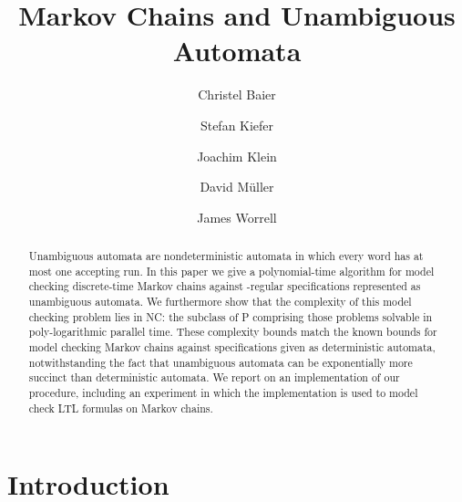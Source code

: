 \documentclass{elsarticle}
\begin{document}
\begin{abstract}
  Unambiguous automata are nondeterministic automata in which every
  word has at most one accepting run.  In this paper we give a
  polynomial-time algorithm for model checking discrete-time Markov
  chains against -regular specifications represented as unambiguous
  automata.  We furthermore show that the complexity of this model
  checking problem lies in NC: the subclass of P comprising
  those problems solvable in poly-logarithmic parallel time.  These
  complexity bounds match the known bounds for model checking Markov
  chains against specifications given as deterministic automata,
  notwithstanding the fact that unambiguous automata can be
  exponentially more succinct than deterministic automata.  We report
  on an implementation of our procedure, including an experiment in
  which the implementation is used to model check LTL formulas on
  Markov chains.
\end{abstract}
\pagestyle{headings}  

\title{Markov Chains and Unambiguous Automata}


\author[tud]{Christel Baier\texorpdfstring{}{}}
\author[oxf]{Stefan Kiefer\texorpdfstring{}{}}
\author[tud]{Joachim Klein\texorpdfstring{}{}}
\author[tud]{David M\"uller\texorpdfstring{}{}}
\author[oxf]{James Worrell\texorpdfstring{}{}}





\address[tud]{Technische Universit\"at Dresden, Germany}
\address[oxf]{University of Oxford, United Kingdom}
\maketitle              


 
\section{Introduction}
\end{document}

